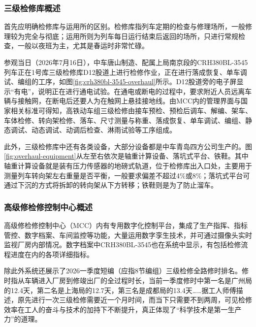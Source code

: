 \subsubsection{三级检修库概述}
首先应明确检修库与运用所的区别。检修库指列车定期的检查与修理场所，一般修理较为完全与彻底；运用所则为列车每日运行结束后返回的场所，只进行常规检查，一般以夜班为主，尤其是春运时非常忙碌。\par{}
参观当日（2026年7月16日），中车唐山制造、配属上局南京段的CRH380BL-3545列车正在1号库三级检修库D12股道上进行检修作业，正在进行落成恢复、单车调试、编组的工序，如图\ref{fig:crh380bl-3545-overhaul}所示。D12股道旁的电子屏显示“有电”，说明正在进行通电试验。在通电或断电的过程中，要求附近人员远离车辆与接触网，在断电后还要人为在触网上悬挂接地线。由MCC内的管理界面与国家相关标准可得知，高铁动车组三级检修由接车预检、预检后调车、解编、架车、车体检修、转向架检修、落车、尺寸测量与称重、落成恢复、单车调试、编组、静态调试、动态调试、动调后检查、淋雨试验等工序组成。\par{}
此外，三级检修库中还有各类设备，大部分设备都是中车青岛四方公司生产的。图\ref{fig:overhaul-equipment}从左至右依次是轴重计算设备、落坑式平台、铁鞋。其中轴重计算设备就是装有压力传感器的地磅式轨道，位于检修库出入口处，主要用于测量列车转向架左右重量是否平衡，一般要求偏差不超过4\%或8\%；落坑式平台可通过下沉的方式将拆卸的转向架从下方转移；铁鞋则是为了防止溜车。\par{}

\subsubsection{高级修检修控制中心概述}
高级修检修控制中心（MCC）内有专用数字化控制平台，集成了生产指挥、指标管控、数字档案、车间监控等功能，大量运用数字孪生技术，并可通过摄像头实时监视厂房内部情况。数字档案中CRH380BL-3545也在系统中显示，有包括检修流程进度在内的各项详细指标。\par{}
除此外系统还展示了2026一季度短编（应指8节编组）三级检修全路修时排名。修时指从车辆进入厂房到修竣出厂的全过程时长，当前一季度修时中第一名是广州局的12.4天，第二名是上海局的12.7天，第三名是成都局的13.4天……据工人师傅描述，原先进行一次三级检修需要近一个月时间，而当下只需要不到两周，可见检修效率在工人的奋斗与技术的加持下不断提升，真正体现了“科学技术是第一生产力”的道理。\par{}

